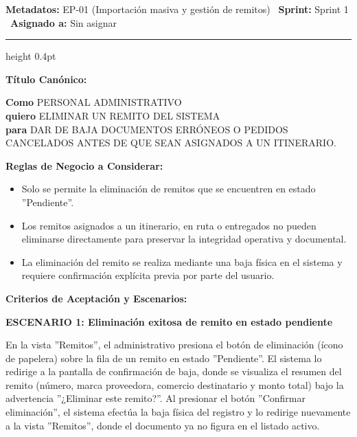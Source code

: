 \documentclass[a4paper,9pt]{article}
\begin{document}
\begin{tcolorbox}[hucard, title={\textbf{HU-42: ELIMINAR REMITO} \hfill \scriptsize \colorbox{tealstatus}{\textbf{\ Accepted\ }} \quad \colorbox{white}{\textcolor{primarydark}{\textbf{\ 2 pts\ }}}}]
\vspace{-1pt}
\noindent\textbf{\footnotesize Metadatos:} EP-01 (Importación masiva y gestión de remitos) \textbar\ \textbf{Sprint:} Sprint 1 \textbar\ \textbf{Asignado a:} Sin asignar\par\vspace{2pt}
\hrule height 0.4pt\par\vspace{3pt}
\noindent\textbf{\footnotesize Título Canónico:}\par\vspace{1pt}
{\small \textbf{Como} PERSONAL ADMINISTRATIVO \\ \textbf{quiero} ELIMINAR UN REMITO DEL SISTEMA \\ \textbf{para} DAR DE BAJA DOCUMENTOS ERRÓNEOS O PEDIDOS CANCELADOS ANTES DE QUE SEAN ASIGNADOS A UN ITINERARIO.}\par\vspace{3pt}
\noindent\textbf{\footnotesize Reglas de Negocio a Considerar:}\par\vspace{1pt}
{\footnotesize
\begin{itemize}[leftmargin=12pt, nosep, itemsep=1.5pt, topsep=1pt]
\item Solo se permite la eliminación de remitos que se encuentren en estado ''Pendiente''.
\item Los remitos asignados a un itinerario, en ruta o entregados no pueden eliminarse directamente para preservar la integridad operativa y documental.
\item La eliminación del remito se realiza mediante una baja física en el sistema y requiere confirmación explícita previa por parte del usuario.
\end{itemize}
}\par\vspace{3pt}
\noindent\textbf{\footnotesize Criterios de Aceptación y Escenarios:}\par\vspace{2pt}
{\footnotesize
\noindent\textbf{\textcolor{secondarydark}{ESCENARIO 1:  Eliminación exitosa de remito en estado pendiente}}\par\vspace{1pt}
En la vista ''Remitos'', el administrativo presiona el botón de eliminación (ícono de papelera) sobre la fila de un remito en estado ''Pendiente''. El sistema lo redirige a la pantalla de confirmación de baja, donde se visualiza el resumen del remito (número, marca proveedora, comercio destinatario y monto total) bajo la advertencia ''¿Eliminar este remito?''. Al presionar el botón ''Confirmar eliminación'', el sistema efectúa la baja física del registro y lo redirige nuevamente a la vista ''Remitos'', donde el documento ya no figura en el listado activo.\par\vspace{2.5pt}
}
\end{tcolorbox}
\end{document}

